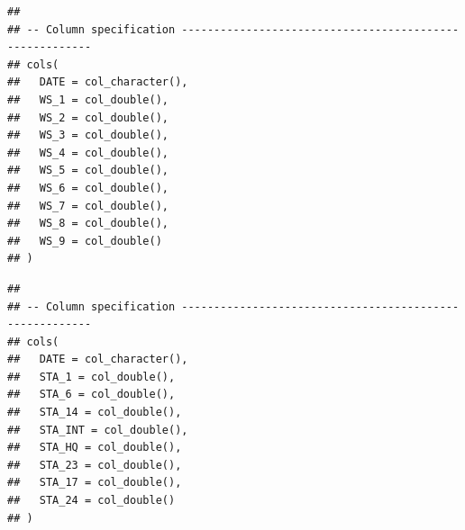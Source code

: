 \documentclass[
]{book}
\newenvironment{Shaded}{\begin{snugshade}}{\end{snugshade}}
\newcommand{\AttributeTok}[1]{\textcolor[rgb]{0.77,0.63,0.00}{#1}}
\newcommand{\CommentTok}[1]{\textcolor[rgb]{0.56,0.35,0.01}{\textit{#1}}}
\newcommand{\FunctionTok}[1]{\textcolor[rgb]{0.00,0.00,0.00}{#1}}
\newcommand{\NormalTok}[1]{#1}
\newcommand{\OtherTok}[1]{\textcolor[rgb]{0.56,0.35,0.01}{#1}}
\newcommand{\SpecialCharTok}[1]{\textcolor[rgb]{0.00,0.00,0.00}{#1}}
\newcommand{\StringTok}[1]{\textcolor[rgb]{0.31,0.60,0.02}{#1}}
\begin{document}
\begin{Shaded}
\end{Shaded}

\begin{verbatim}
## 
## -- Column specification --------------------------------------------------------
## cols(
##   DATE = col_character(),
##   WS_1 = col_double(),
##   WS_2 = col_double(),
##   WS_3 = col_double(),
##   WS_4 = col_double(),
##   WS_5 = col_double(),
##   WS_6 = col_double(),
##   WS_7 = col_double(),
##   WS_8 = col_double(),
##   WS_9 = col_double()
## )
\end{verbatim}

\begin{Shaded}
\end{Shaded}

\begin{verbatim}
## 
## -- Column specification --------------------------------------------------------
## cols(
##   DATE = col_character(),
##   STA_1 = col_double(),
##   STA_6 = col_double(),
##   STA_14 = col_double(),
##   STA_INT = col_double(),
##   STA_HQ = col_double(),
##   STA_23 = col_double(),
##   STA_17 = col_double(),
##   STA_24 = col_double()
## )
\end{verbatim}
\end{document}
